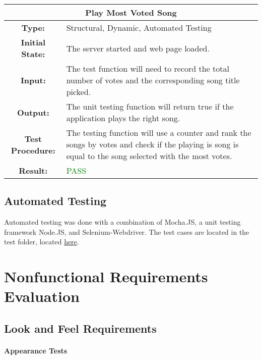 \documentclass[12pt, titlepage]{article}
\begin{document}
\begin{center}
\begin{table}[H]
\begin{tabularx}{\textwidth}{| c X |}
\hline
\multicolumn{2}{|c|}{\textbf{Play Most Voted Song}}\\
\hline
\textbf{Type: } & Structural, Dynamic, Automated Testing\\


\textbf{Initial State: } & The server started and web page loaded.\\


\textbf{Input: } & The test function will need to record the total number of votes and the corresponding song title picked.\\


\textbf{Output: } & The unit testing function will return true if the application plays the right song.\\


\textbf{Test Procedure: } &The testing function will use a counter and rank the songs by votes and check if the playing is song is equal to the song selected with the most votes. \\


\textbf{Result: } & \textcolor{green}{PASS}\\
\hline
\end{tabularx}
\end{table}
\end{center}

\subsection{Automated Testing}

Automated testing was done with a combination of Mocha.JS, a unit testing framework Node.JS, and Selenium-Webdriver. The test cases are located in the test folder, located \href{https://gitlab.cas.mcmaster.ca/velechva/DJS/tree/master/src/test}{here}. 



\section{Nonfunctional Requirements Evaluation}
\subsection{Look and Feel Requirements}

\paragraph{Appearance Tests}
\end{document}
